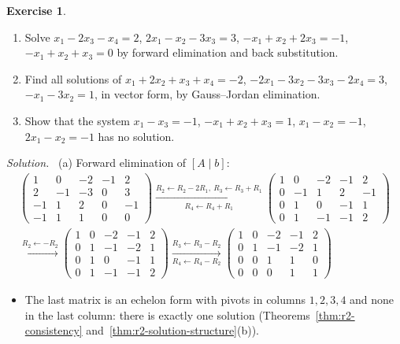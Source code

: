 \documentclass[12pt]{article}
\theoremstyle{definition}
\newtheorem{exercise}{Exercise}
\newenvironment{solution}{\par\noindent\textit{Solution.}\ }{\par\smallskip}
\begin{document}
\begin{exercise}\label{r2-dr-solve}
\begin{enumerate}
\item Solve \(x_1-2x_3-x_4=2\), \(2x_1-x_2-3x_3=3\), \(-x_1+x_2+2x_3=-1\), \(-x_1+x_2+x_3=0\) by forward elimination
and back substitution.
\item Find all solutions of \(x_1+2x_2+x_3+x_4=-2\), \(-2x_1-3x_2-3x_3-2x_4=3\), \(-x_1-3x_2=1\), in vector form,
by Gauss--Jordan elimination.
\item Show that the system \(x_1-x_3=-1\), \(-x_1+x_2+x_3=1\), \(x_1-x_2=-1\), \(2x_1-x_2=-1\) has no solution.
\end{enumerate}
\end{exercise}
\begin{solution}
(a) Forward elimination of \([A\mid b]\):
\[
\begin{gathered}
\left(\begin{array}{cccc|c}1&0&-2&-1&2\\2&-1&-3&0&3\\-1&1&2&0&-1\\-1&1&1&0&0\end{array}\right)
\xrightarrow[R_4\leftarrow R_4+R_1]{R_2\leftarrow R_2-2R_1,\ R_3\leftarrow R_3+R_1}
\left(\begin{array}{cccc|c}1&0&-2&-1&2\\0&-1&1&2&-1\\0&1&0&-1&1\\0&1&-1&-1&2\end{array}\right)
\\
\xrightarrow{R_2\leftarrow-R_2}
\left(\begin{array}{cccc|c}1&0&-2&-1&2\\0&1&-1&-2&1\\0&1&0&-1&1\\0&1&-1&-1&2\end{array}\right)
\xrightarrow[R_4\leftarrow R_4-R_2]{R_3\leftarrow R_3-R_2}
\left(\begin{array}{cccc|c}1&0&-2&-1&2\\0&1&-1&-2&1\\0&0&1&1&0\\0&0&0&1&1\end{array}\right)
\end{gathered}
\]
\begin{itemize}
\item The last matrix is an echelon form with pivots in columns \(1,2,3,4\) and none in the last column: there is
exactly one solution (Theorems~\ref{thm:r2-consistency} and~\ref{thm:r2-solution-structure}(b)).

\end{itemize}
\end{solution}
\end{document}
